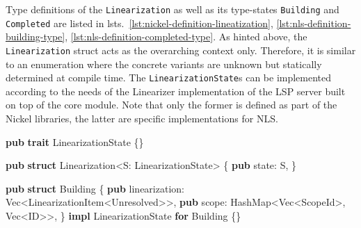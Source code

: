 \documentclass[
  a4paper,
  bibtex,
  english,
  nomenclature]{kthlatex/kththesis/kththesis}
\newenvironment{Shaded}{}{}
\newcommand{\DataTypeTok}[1]{\textcolor[rgb]{0.56,0.13,0.00}{#1}}
\newcommand{\KeywordTok}[1]{\textcolor[rgb]{0.00,0.44,0.13}{\textbf{#1}}}
\newcommand{\NormalTok}[1]{#1}
\newcommand{\OperatorTok}[1]{\textcolor[rgb]{0.40,0.40,0.40}{#1}}
\begin{document}
Type definitions of the \texttt{Linearization} as well as its
type-states \texttt{Building} and \texttt{Completed} are listed in
lsts.~\ref{lst:nickel-definition-lineatization}, \ref{lst:nls-definition-building-type}, \ref{lst:nls-definition-completed-type}.
As hinted above, the \texttt{Linearization} struct acts as the
overarching context only. Therefore, it is similar to an enumeration
where the concrete variants are unknown but statically determined at
compile time. The \texttt{LinearizationState}s can be implemented
according to the needs of the Linearizer implementation of the LSP
server built on top of the core module. Note that only the former is
defined as part of the Nickel libraries, the latter are specific
implementations for NLS.

\begin{codelisting}

\caption{Definition of Linearization structure}

\hypertarget{lst:nickel-definition-lineatization}{%
\label{lst:nickel-definition-lineatization}}%
\begin{Shaded}
\begin{Highlighting}[]
\KeywordTok{pub} \KeywordTok{trait}\NormalTok{ LinearizationState }\OperatorTok{\{\}}

\KeywordTok{pub} \KeywordTok{struct}\NormalTok{ Linearization}\OperatorTok{\textless{}}\NormalTok{S}\OperatorTok{:}\NormalTok{ LinearizationState}\OperatorTok{\textgreater{}} \OperatorTok{\{}
    \KeywordTok{pub}\NormalTok{ state}\OperatorTok{:}\NormalTok{ S}\OperatorTok{,}
\OperatorTok{\}}
\end{Highlighting}
\end{Shaded}

\end{codelisting}

\begin{codelisting}

\caption{Type Definition of Building state}

\hypertarget{lst:nls-definition-building-type}{%
\label{lst:nls-definition-building-type}}%
\begin{Shaded}
\begin{Highlighting}[]
\KeywordTok{pub} \KeywordTok{struct}\NormalTok{ Building }\OperatorTok{\{}
    \KeywordTok{pub}\NormalTok{ linearization}\OperatorTok{:} \DataTypeTok{Vec}\OperatorTok{\textless{}}\NormalTok{LinearizationItem}\OperatorTok{\textless{}}\NormalTok{Unresolved}\OperatorTok{\textgreater{}\textgreater{},}
    \KeywordTok{pub}\NormalTok{ scope}\OperatorTok{:}\NormalTok{ HashMap}\OperatorTok{\textless{}}\DataTypeTok{Vec}\OperatorTok{\textless{}}\NormalTok{ScopeId}\OperatorTok{\textgreater{},} \DataTypeTok{Vec}\OperatorTok{\textless{}}\NormalTok{ID}\OperatorTok{\textgreater{}\textgreater{},}
\OperatorTok{\}}
\KeywordTok{impl}\NormalTok{ LinearizationState }\KeywordTok{for}\NormalTok{ Building }\OperatorTok{\{\}}
\end{Highlighting}
\end{Shaded}

\end{codelisting}
\end{document}
